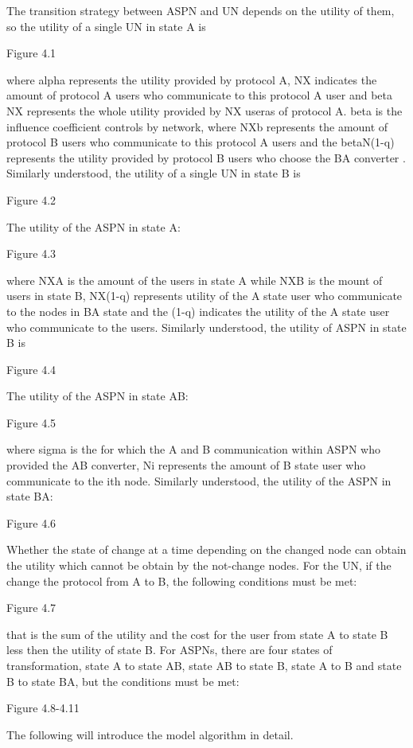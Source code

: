 \documentclass{article}
\begin{document}
The transition strategy between ASPN and UN depends on the utility of them, so the utility of a single UN in state A is

Figure 4.1

where alpha represents the utility provided by protocol A, NX indicates the amount of protocol A users who communicate to 
this protocol A user and beta NX represents the whole utility provided by NX useras of protocol A.  beta is the influence 
coefficient controls by network, where NXb represents the amount of protocol B users who communicate to this protocol A 
users and the betaN(1-q) represents the utility provided by protocol B users who choose the BA converter . Similarly 
understood, the utility of a single UN in state B is

Figure 4.2

The utility of the ASPN in state A:

Figure 4.3

where NXA is the amount of the users in state A while NXB is the mount  of users in state B, NX(1-q) represents  utility of 
the A state user who communicate to the nodes in BA state and the (1-q) indicates the utility of the A state user who communicate 
to the users. Similarly understood, the utility of ASPN in state B is

Figure 4.4

The utility of the ASPN in state AB:

Figure 4.5

where sigma is the for which the A and B  communication within ASPN who provided the AB converter, Ni represents 
the amount of B state user who communicate to the ith node. Similarly understood, the utility of the ASPN in state BA:

Figure 4.6

Whether the state of change at a time depending on the changed node can obtain the utility which cannot be obtain 
by the not-change nodes. For the UN, if the change the protocol from A to B, the following conditions must be met:

Figure 4.7

that is the sum of the utility  and the cost for the user from state A to state B less then the utility of state B. 
For ASPNs, there are four states of transformation, state A to state AB, state AB to state B, state A to B and state B 
to state BA, but the conditions must be met:

Figure 4.8-4.11

The following will introduce the model algorithm in detail.
\end{document}
